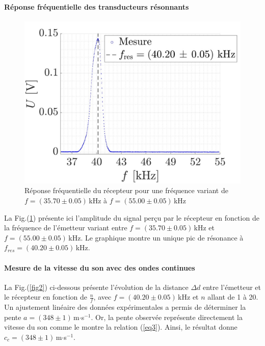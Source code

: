 \documentclass[a4paper, 12pt,oneside]{article}
\begin{document}
\paragraph{Réponse fréquentielle des transducteurs résonnants}

\begin{figure}
    \centering
    \includegraphics[width=1\linewidth]{Graphes_TP_F7/grph1.jpg}
    \captionsetup{justification=centering}
    \caption{Réponse fréquentielle du récepteur pour une fréquence variant de $f = (35.70 \pm 0.05)$\,kHz à $f = (55.00 \pm 0.05)$\,kHz}
    \label{fig1}
\end{figure}

La Fig.(\ref{fig1}) présente ici l'amplitude du signal perçu par le récepteur en fonction de la fréquence de l'émetteur variant entre $f = (35.70 \pm 0.05)$\,kHz et $f = (55.00 \pm 0.05)$\,kHz. Le graphique montre un unique pic de résonance à $f_{res} = (40.20 \pm 0.05)$\,kHz. 

\paragraph{Mesure de la vitesse du son avec des ondes continues}

La Fig.(\ref{fig2}) ci-dessous présente l’évolution de la distance $\Delta d$ entre l’émetteur et le récepteur en fonction de $\frac{n}{f}$, avec $f = (40.20 \pm 0.05)$\,kHz et $n$ allant de 1 à 20. Un ajustement linéaire des données expérimentales a permis de déterminer la pente $a = (348 \pm 1)$\,m$\cdot$s$^{-1}$. Or, la pente observée représente directement la vitesse du son comme le montre la relation (\ref{eq3}). Ainsi, le résultat donne $c_c = (348 \pm 1) \,$m$\cdot$s$^{-1}$.
\end{document}
